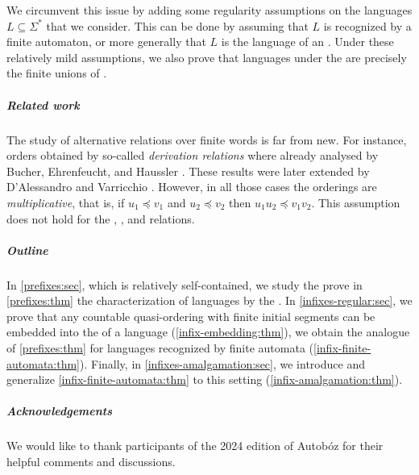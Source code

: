We circumvent this issue by adding some regularity assumptions on the languages
$L \subseteq \Sigma^*$ that we consider. This can be done by assuming that $L$
is recognized by a finite automaton, or more generally that $L$ is the language
of an . Under these relatively mild assumptions, we
also prove that  languages under the 
are precisely the finite unions of .

\subparagraph{Related work} The study of alternative 
relations over finite words is far from new. For instance, orders obtained by
so-called \emph{derivation relations} where already analysed by Bucher,
Ehrenfeucht, and Haussler \cite{BUEUD85}. These results were later extended by
D'Alessandro and Varricchio \cite{ALVA03,ALVA06}. However, in all those cases
the orderings are \emph{multiplicative}, that is, if $u_1 \preceq v_1$ and $u_2
\preceq v_2$ then $u_1u_2 \preceq v_1v_2$. This assumption does not hold for
the , , and  relations.

\subparagraph{Outline} In \cref{prefixes:sec}, which is relatively
self-contained, we study the  prove in \cref{prefixes:thm}
the characterization of  languages by the . In \cref{infixes-regular:sec}, we prove that any countable quasi-ordering
with finite initial segments can be embedded into the  of a
language (\cref{infix-embedding:thm}), we obtain the analogue of
\cref{prefixes:thm} for languages recognized by finite automata
(\cref{infix-finite-automata:thm}). Finally, in \cref{infixes-amalgamation:sec}, we
introduce  and generalize
\cref{infix-finite-automata:thm} to this setting
(\cref{infix-amalgamation:thm}).

\subparagraph{Acknowledgements} We would like to thank participants of the 2024
edition of Autobóz for their helpful comments and discussions.
